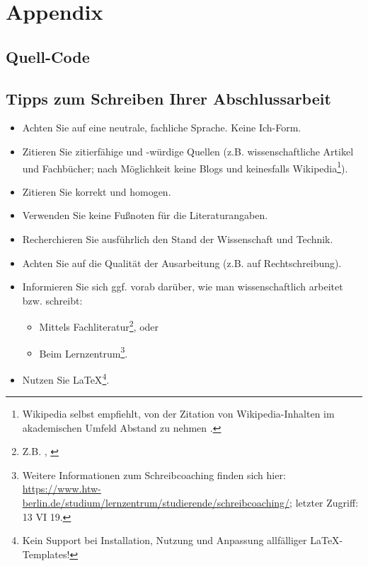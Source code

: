 \appendix

\chapter{Appendix}

\section{Quell-Code}

\section{Tipps zum Schreiben Ihrer Abschlussarbeit}

\begin{itemize}
    \item Achten Sie auf eine neutrale, fachliche Sprache. Keine \glqq{}Ich\grqq{}-Form.
    \item Zitieren Sie zitierf\"ahige und -w\"urdige Quellen (z.B. wissenschaftliche Artikel und Fachb\"ucher; nach M\"oglichkeit keine Blogs und keinesfalls Wikipedia\footnote{Wikipedia selbst empfiehlt, von der Zitation von Wikipedia-Inhalten im akademischen Umfeld Abstand zu nehmen \autocite{wikipedia2019}.}).
    \item Zitieren Sie korrekt und homogen.
    \item Verwenden Sie keine Fu{\ss}noten f\"ur die Literaturangaben.
    \item Recherchieren Sie ausf\"uhrlich den Stand der Wissenschaft und Technik.
    \item Achten Sie auf die Qualit\"at der Ausarbeitung (z.B. auf Rechtschreibung).
    \item Informieren Sie sich ggf. vorab dar\"uber, wie man wissenschaftlich arbeitet bzw. schreibt:
          \begin{itemize}
              \item Mittels Fachliteratur\footnote{Z.B. \autocite{balzert2011}, \autocite{franck2013}}, oder
              \item Beim Lernzentrum\footnote{Weitere Informationen zum Schreibcoaching finden sich hier: \url{https://www.htw-berlin.de/studium/lernzentrum/studierende/schreibcoaching/}; letzter Zugriff: 13 VI 19.}.
          \end{itemize}
    \item Nutzen Sie \LaTeX\footnote{Kein Support bei Installation, Nutzung und Anpassung allf\"alliger \LaTeX-Templates!}.
\end{itemize}



